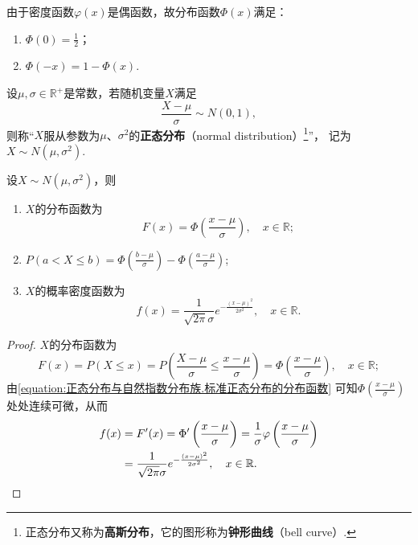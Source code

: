 \begin{property}
由于密度函数\(\varphi(x)\)是偶函数，故分布函数\(\Phi(x)\)满足：
\begin{enumerate}
\item \(\Phi(0) = \frac{1}{2}\)；
\item \(\Phi(-x) = 1 - \Phi(x)\).
\end{enumerate}
\end{property}

\begin{definition}
设\(\mu,\sigma\in\mathbb{R}^+\)是常数，若随机变量\(X\)满足\[
\frac{X-\mu}{\sigma} \sim N(0,1),
\]
则称“\(X\)服从参数为\(\mu\)、\(\sigma^2\)的\textbf{正态分布}（normal distribution）\footnote{%
正态分布又称为\textbf{高斯分布}，它的图形称为\textbf{钟形曲线}（bell curve）.
}”，%
记为\(X \sim N(\mu,\sigma^2)\).
\end{definition}

\begin{theorem}
设\(X \sim N(\mu,\sigma^2)\)，则
\begin{enumerate}
\item \(X\)的分布函数为\[
F(x) = \Phi\left(\frac{x-\mu}{\sigma}\right),
\quad x\in\mathbb{R};
\]
\item \(P(a < X \leqslant b) = \Phi\left(\frac{b-\mu}{\sigma}\right) - \Phi\left(\frac{a-\mu}{\sigma}\right)\);
\item \(X\)的概率密度函数为\[
f(x) = \frac{1}{\sqrt{2 \pi} \sigma} e^{-\frac{(x-\mu)^2}{2\sigma^2}},
\quad x\in\mathbb{R}.
\]
\end{enumerate}
\begin{proof}
\(X\)的分布函数为\[
F(x) = P(X \leqslant x)
= P\left(\frac{X-\mu}{\sigma}\leqslant\frac{x-\mu}{\sigma}\right)
= \Phi\left(\frac{x-\mu}{\sigma}\right), \quad x\in\mathbb{R};
\]由\cref{equation:正态分布与自然指数分布族.标准正态分布的分布函数} 可知\(\Phi\left(\frac{x-\mu}{\sigma}\right)\)处处连续可微，从而\begin{align*}
f(x) &= F'(x) = \Phi'\left(\frac{x-\mu}{\sigma}\right)
= \frac{1}{\sigma} \varphi\left(\frac{x-\mu}{\sigma}\right) \\
&= \frac{1}{\sqrt{2 \pi} \sigma} e^{-\frac{(x-\mu)^2}{2\sigma^2}},
\quad x\in\mathbb{R}.
\qedhere
\end{align*}
\end{proof}
\end{theorem}

